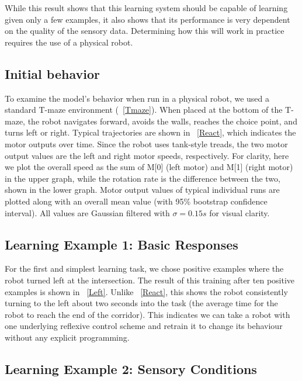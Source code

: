 \documentclass{frontiersSCNS}
\begin{document}
While this result shows that this learning system should be capable of
learning given only a few examples, it also shows that its performance is
very dependent on the quality of the sensory data.  Determining how this
will work in practice requires the use of a physical robot.


\subsection{Initial behavior}

To examine the model's behavior when run in a physical robot, we used a standard T-maze
environment (\figurename~\ref{Tmaze}). When placed at the bottom
of the T-maze, the robot navigates forward, avoids the
walls, reaches the choice point, and turns left or right.
Typical trajectories are shown in \figurename~\ref{React}, which indicates
the motor outputs over time. Since the robot uses tank-style treads, the 
two motor output values are the left and right motor speeds, respectively. 
For clarity, here we plot the overall speed as the sum of M[0] (left motor) 
and M[1] (right motor) in the upper graph, while the rotation rate is the difference between the two,
shown in the lower graph. 
Motor output values of typical individual runs are plotted along with an overall 
mean value (with 95\% bootstrap confidence interval). All values are Gaussian 
filtered with $\sigma=0.15s$ for visual clarity.

\subsection{Learning Example 1: Basic Responses}

For the first and simplest learning task, we chose positive examples
where the robot turned left at the intersection.
The result of this training after ten positive examples is shown in \figurename~\ref{Left}. Unlike 
\figurename~\ref{React}, this shows the robot consistently turning to the left about 
two seconds into the task (the average time for the robot to reach the end of the corridor).
This indicates we can take a robot with one underlying reflexive control scheme
and retrain it to change its behaviour without any explicit programming.

\subsection{Learning Example 2: Sensory Conditions} \label{learningConditions}
\end{document}
